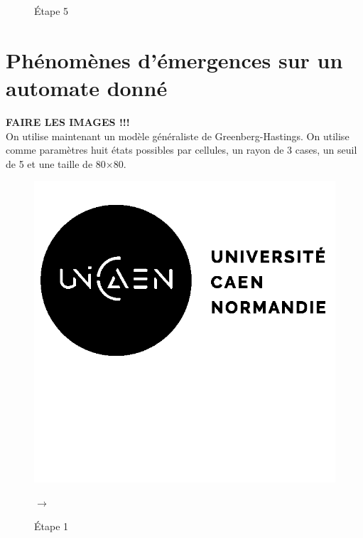 \documentclass[12pt, a4paper]{article}
\begin{document}
\begin{center}
\begin{figure}[!h]
\begin{minipage}{.3\linewidth}
                    \caption{Étape 5}
                \end{minipage}
            \end{figure}
        \end{center}
    
    
    \section{Phénomènes d'émergences sur un automate donné}
        \textbf{FAIRE LES IMAGES !!!\\}
        On utilise maintenant un modèle généraliste de Greenberg-Hastings. On utilise comme paramètres huit états possibles par cellules, un rayon de 3 cases, un seuil de 5 et une taille de 80$\times$80.
        \begin{center}
            \begin{figure}[!h]
                \centering
                \begin{minipage}{.3\linewidth}
                    \centering
                    \includegraphics[scale=0.2]{img/logo.png}
                    \caption{Étape 1}
                \end{minipage}
                $\rightarrow$
                \begin{minipage}{.3\linewidth}
                    \centering

\end{minipage}
\end{figure}
\end{center}
\end{document}

